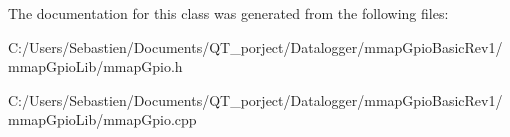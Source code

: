 The documentation for this class was generated from the following files\+:\begin{DoxyCompactItemize}
\item 
C\+:/\+Users/\+Sebastien/\+Documents/\+Q\+T\+\_\+porject/\+Datalogger/mmap\+Gpio\+Basic\+Rev1/mmap\+Gpio\+Lib/mmap\+Gpio.\+h\item 
C\+:/\+Users/\+Sebastien/\+Documents/\+Q\+T\+\_\+porject/\+Datalogger/mmap\+Gpio\+Basic\+Rev1/mmap\+Gpio\+Lib/mmap\+Gpio.\+cpp\end{DoxyCompactItemize}
